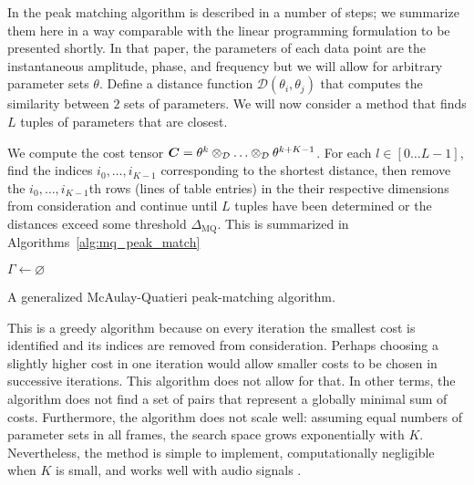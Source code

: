 \documentclass{article}
\def\argmin{\mathop{\rm arg\,min}}
\newcommand{\D}{\displaystyle}
\newcommand{\BS}[1]{\boldsymbol{#1}}
\begin{document}
\begin{sloppy}
In \cite[q.~748]{mcaulay1986speech} the peak matching algorithm is described in
a number of steps; we summarize them here in a way comparable with the linear
programming formulation to be presented shortly. In that paper, the parameters
of each data point are the instantaneous amplitude, phase, and frequency but we
will allow for arbitrary parameter sets $\theta$.  Define a distance function
$\mathcal{D}
\left( \theta_{i},\theta_{j} \right)$ that computes the
similarity between $2$ sets of parameters. We will now consider a method that
finds $L$ tuples of parameters that are closest.

We compute the cost tensor
$
    \BS{C} = \theta^{k}
    \otimes_{\mathcal{D}} \mathellipsis \otimes_{\mathcal{D}} \theta^{k+K-1}
$.
For each $l \in \left[0 \dotsc L-1 \right]$, find the indices
$i_{0},\dotsc,i_{K-1}$ 
corresponding to the shortest
distance, then remove the $i_{0},\dotsc,i_{K-1}$th rows (lines of table entries)
in the their respective dimensions from consideration
and continue until $L$ tuples have been determined or the distances exceed some
threshold $\Delta_{\text{MQ}}$. This is summarized in Algorithms~\ref{alg:mq_peak_match}

\begin{algorithm}
    \KwIn{the cost matrix $\BS{C}$}
    $\Gamma \leftarrow \varnothing$\;
    \For{$l \leftarrow 0$ to $L-1$}{
        $\D \Gamma_{l}=\argmin_{[0,\dotsc,M_{0}-1] \times
        \mathellipsis \times [0,\dotsc,M_{K-1}-1] \setminus \Gamma}
            \BS{C}$\;
            \If{$ C_{\Gamma_{l}} > \Delta_{\text{MQ}}$}{
            \KwRet{$\Gamma$}
        }
        $\Gamma \leftarrow \Gamma \cup C_{\Gamma_{l}}$\;
    }
    \KwRet{$\Gamma$}
    \caption{A generalized McAulay-Quatieri peak-matching algorithm.}%
    \label{alg:mq_peak_match}
\end{algorithm}

This is a greedy algorithm because on every iteration the smallest cost is
identified and its indices are removed from consideration. Perhaps choosing a
slightly higher cost in one iteration would allow smaller costs to be chosen in
successive iterations. This algorithm does not allow for that. In other terms,
the algorithm does not find a set of pairs that represent a globally minimal sum of
costs.
Furthermore, the algorithm does not scale well: assuming equal numbers of
parameter sets in all frames, the search space grows exponentially with
$K$. Nevertheless, the method is simple to implement, computationally negligible
when $K$ is small, and works well with audio signals \cite{mcaulay1986speech}
\cite{smith1987parshl}.


\end{sloppy}
\end{document}
